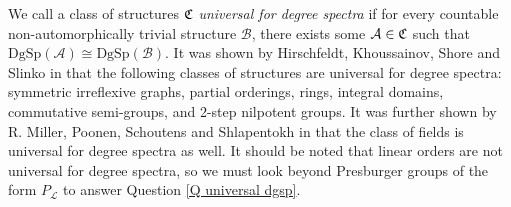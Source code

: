 \documentclass{amsart}%
\numberwithin{theorem}{section}
\newcommand{\A}{\mathcal{A}}
\newcommand{\B}{\mathcal{B}}
\newcommand{\0}{\emptyset}
\newcommand{\LL}{\mathcal{L}}
\newcommand{\dgsp}{\text{DgSp}}
\begin{document}
We call a class of structures $\frak{C}$ \emph{universal for degree spectra} if for every countable non-automorphically trivial structure $\B$, there exists some $\A\in \frak{C}$ such that $\dgsp(\A)\cong \dgsp(\B)$. It was shown by Hirschfeldt, Khoussainov, Shore and Slinko in \cite{hirschfeldt-et-al} that the following classes of structures are universal for degree spectra: symmetric irreflexive graphs, partial orderings, rings, integral domains, commutative semi-groups, and 2-step nilpotent groups. It was further shown by R. Miller, Poonen, Schoutens and Shlapentokh in \cite{Miller-fields} that the class of fields is universal for degree spectra as well. It should be noted that linear orders are not universal for degree spectra, so we must look beyond Presburger groups of the form $P_\LL$ to answer Question \ref{Q universal dgsp}.











    




 




\end{document}
